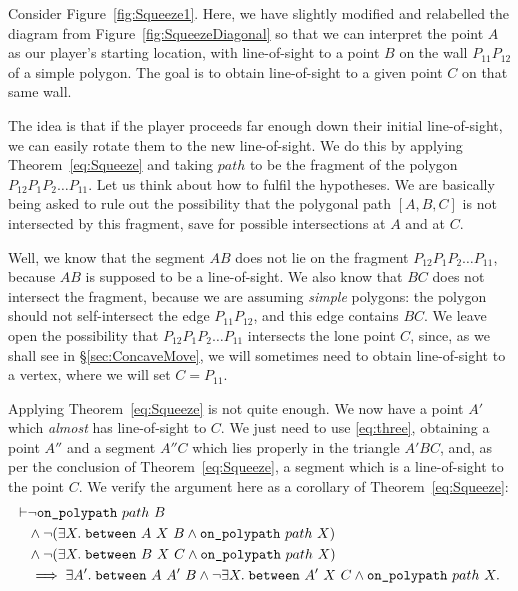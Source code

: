 Consider Figure~\ref{fig:Squeeze1}. Here, we have slightly modified and relabelled the diagram from Figure~\ref{fig:SqueezeDiagonal} so that we can interpret the point $A$ as our player's starting location, with line-of-sight to a point $B$ on the wall $P_{11}P_{12}$ of a simple polygon. The goal is to obtain line-of-sight to a given point $C$ on that same wall.

The idea is that if the player proceeds far enough down their initial line-of-sight, we can easily rotate them to the new line-of-sight. We do this by applying Theorem~\ref{eq:Squeeze} and taking $path$ to be the fragment of the polygon $P_{12}P_1P_2\ldots P_{11}$. Let us think about how to fulfil the hypotheses. We are basically being asked to rule out the possibility that the polygonal path $[A,B,C]$ is not intersected by this fragment, save for possible intersections at $A$ and at $C$. 

Well, we know that the segment $AB$ does not lie on the fragment $P_{12}P_1P_2\ldots P_{11}$, because $AB$ is supposed to be a line-of-sight. We also know that $BC$ does not intersect the fragment, because we are assuming \emph{simple} polygons: the polygon should not self-intersect the edge $P_{11}P_{12}$, and this edge contains $BC$. We leave open the possibility that $P_{12}P_1P_2\ldots P_{11}$ intersects the lone point $C$, since, as we shall see in \S\ref{sec:ConcaveMove}, we will sometimes need to obtain line-of-sight to a vertex, where we will set $C=P_{11}$.

Applying Theorem~\ref{eq:Squeeze} is not quite enough. We now have a point $A'$ which \emph{almost} has line-of-sight to $C$. We just need to use \ref{eq:three}, obtaining a point $A''$ and a segment $A''C$ which lies properly in the triangle $A'BC$, and, as per the conclusion of Theorem~\ref{eq:Squeeze}, a segment which is a line-of-sight to the point $C$. We verify the argument here as a corollary of Theorem~\ref{eq:Squeeze}:
\begin{equation}\label{eq:Squeeze2}
  \begin{aligned}
\vdash    &\neg\texttt{on\_polypath}\ path\ B\\
    &\wedge \neg(\exists X.\; \texttt{between}\ A\ X\ B \wedge \texttt{on\_polypath}\ path\ X)\\
    &\wedge \neg(\exists X.\; \texttt{between}\ B\ X\ C \wedge \texttt{on\_polypath}\ path\ X)\\
    &\implies \exists A'.\; \texttt{between}\ A\ A'\ B \wedge \neg\exists X.\; \texttt{between}\ A'\ X\ C \wedge \texttt{on\_polypath}\ path\ X.
  \end{aligned}
\end{equation}

